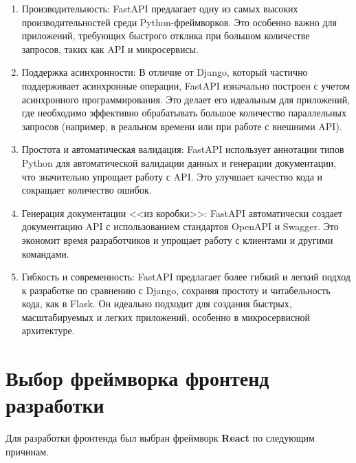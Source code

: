 \begin{enumerate}
	\item Производительность: FastAPI предлагает одну из самых высоких производительностей среди Python-фреймворков. Это особенно важно для приложений, требующих быстрого отклика при большом количестве запросов, таких как API и микросервисы.
	\item Поддержка асинхронности: В отличие от Django, который частично поддерживает асинхронные операции, FastAPI изначально построен с учетом асинхронного программирования. Это делает его идеальным для приложений, где необходимо эффективно обрабатывать большое количество параллельных запросов (например, в реальном времени или при работе с внешними API).
	\item Простота и автоматическая валидация: FastAPI использует аннотации типов Python для автоматической валидации данных и генерации документации, что значительно упрощает работу с API. Это улучшает качество кода и сокращает количество ошибок.
	\item Генерация документации <<из коробки>>: FastAPI автоматически создает документацию API с использованием стандартов OpenAPI и Swagger. Это экономит время разработчиков и упрощает работу с клиентами и другими командами.
	\item Гибкость и современность: FastAPI предлагает более гибкий и легкий подход к разработке по сравнению с Django, сохраняя простоту и читабельность кода, как в Flask. Он идеально подходит для создания быстрых, масштабируемых и легких приложений, особенно в микросервисной архитектуре.
\end{enumerate}


\section{Выбор фреймворка фронтенд разработки}

Для разработки фронтенда был выбран фреймворк \textbf{React} \cite{react} по следующим причинам.

